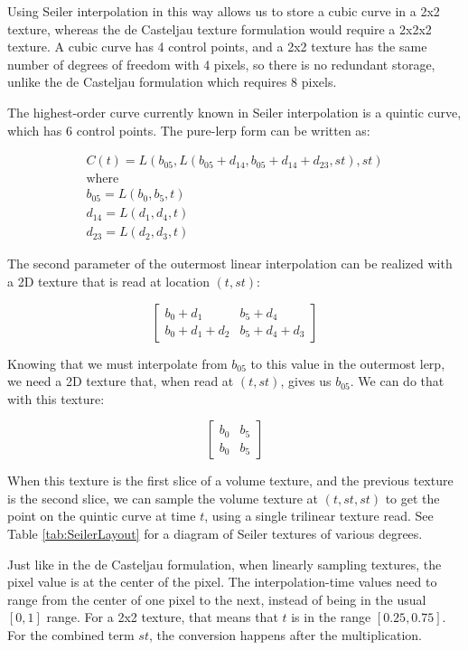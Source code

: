 \documentclass{jcgt}
\begin{document}
Using Seiler interpolation in this way allows us to store a cubic curve in a 2x2 texture, whereas the de Casteljau texture formulation would require a 2x2x2 texture. A cubic curve has 4 control points, and a 2x2 texture has the same number of degrees of freedom with 4 pixels, so
there is no redundant storage, unlike the de Casteljau formulation which requires 8 pixels.

The highest-order curve currently known in Seiler interpolation is a quintic curve, which has 6 control points. The pure-lerp form can be written as:

\begin{equation}
    \begin{split}
    C(t) = L(b_{05}, L(b_{05} + d_{14}, b_{05} + d_{14} + d_{23}, st), st) \\
    \text{where } \\
    b_{05} = L(b_0, b_5, t) \\
    d_{14} = L(d_1, d_4, t) \\
    d_{23} = L(d_2, d_3, t)
    \end{split}
\end{equation}

The second parameter of the outermost linear interpolation can be realized with a 2D texture that is read at location $(t, st)$:

\[
\begin{bmatrix}
b_0 + d_1 & b_5 + d_4 \\
b_0 + d_1 + d_2 & b_5 + d_4 + d_3
\end{bmatrix}
\]

Knowing that we must interpolate from $b_{05}$ to this value in the outermost lerp, we need a 2D texture that, when read at $(t, st)$, gives us $b_{05}$. We can do that with this texture:

\[
\begin{bmatrix}
b_0 & b_5\\
b_0 & b_5
\end{bmatrix}
\]

When this texture is the first slice of a volume texture, and the previous texture is the second slice, we can sample the volume texture at $(t, st, st)$ to get the point on the quintic curve at time $t$, using a single trilinear texture read.
See Table \ref{tab:SeilerLayout} for a diagram of Seiler textures of various degrees.

Just like in the de Casteljau formulation, when linearly sampling textures, the pixel value is at the center of the pixel. The interpolation-time values need to range from the center of one pixel to the next, instead of being in the usual
$[0,1]$ range. For a 2x2 texture, that means that $t$ is in the range $[0.25, 0.75]$. For the combined term $st$, the conversion happens after the multiplication.
\end{document}
